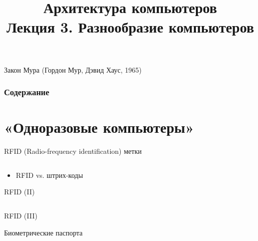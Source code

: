 \newcommand{\h}{handout,%
}



\title[Архитектура компьютеров. Лекция 3]{Архитектура компьютеров\texorpdfstring{\\}{ }Лекция 3. Разнообразие компьютеров}



\begin{frame}
\titlepage
\end{frame}

\begin{frame}[plain]{Закон Мура (Гордон Мур, Дэвид Хаус, 1965)}
\vspace{-.2cm}
\end{frame}

\begin{frame}
\frametitle{Содержание}
\tableofcontents
\end{frame}

\section {«Одноразовые компьютеры»}

\begin{frame}{RFID (Radio-frequency identification) метки}
\begin{columns}
    \column{3cm} 
    \column{5cm} 
\end{columns}
\pause
\begin{itemize}
    \item RFID vs. штрих-коды
\end{itemize}
\end{frame}

\begin{frame}{RFID (II)}
\begin{columns}
    \column{6cm} 
    \column{5cm} \pause{}
\end{columns}
\end{frame}

\begin{frame}{RFID (III)}
\end{frame}

\begin{frame}{Биометрические паспорта}
\end{frame}

